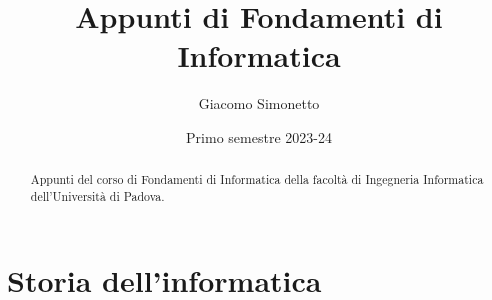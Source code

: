 \documentclass[a4paper]{article}
\title{Appunti di Fondamenti di Informatica}
\author{Giacomo Simonetto}
\date{Primo semestre 2023-24}
\begin{document}
\maketitle
\begin{abstract}
	Appunti del corso di Fondamenti di Informatica della facoltà di Ingegneria Informatica dell'Università di Padova.
\end{abstract}

\newpage

\tableofcontents

\newpage

\section{Storia dell'informatica}
\end{document}
